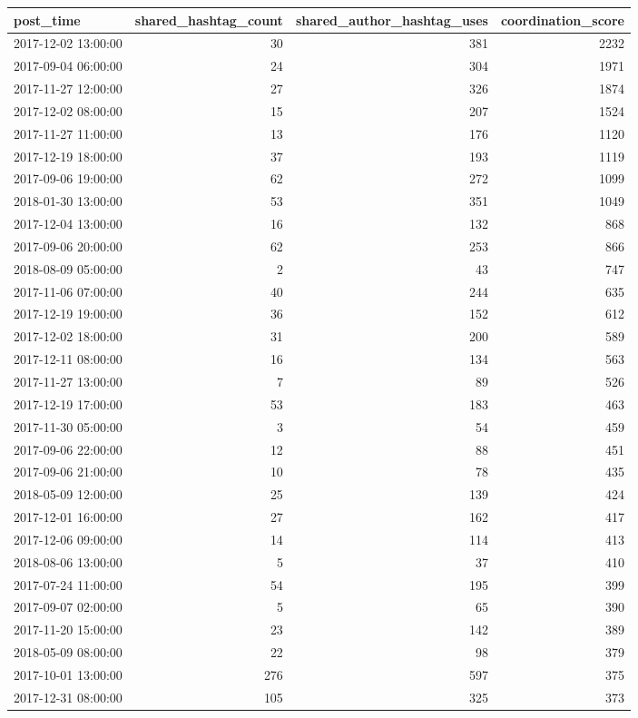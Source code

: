 \begin{tabular}{lrrr}
\toprule
post\_time & shared\_hashtag\_count & shared\_author\_hashtag\_uses & coordination\_score \\
\midrule
2017-12-02 13:00:00 & 30 & 381 & 2232 \\
2017-09-04 06:00:00 & 24 & 304 & 1971 \\
2017-11-27 12:00:00 & 27 & 326 & 1874 \\
2017-12-02 08:00:00 & 15 & 207 & 1524 \\
2017-11-27 11:00:00 & 13 & 176 & 1120 \\
2017-12-19 18:00:00 & 37 & 193 & 1119 \\
2017-09-06 19:00:00 & 62 & 272 & 1099 \\
2018-01-30 13:00:00 & 53 & 351 & 1049 \\
2017-12-04 13:00:00 & 16 & 132 & 868 \\
2017-09-06 20:00:00 & 62 & 253 & 866 \\
2018-08-09 05:00:00 & 2 & 43 & 747 \\
2017-11-06 07:00:00 & 40 & 244 & 635 \\
2017-12-19 19:00:00 & 36 & 152 & 612 \\
2017-12-02 18:00:00 & 31 & 200 & 589 \\
2017-12-11 08:00:00 & 16 & 134 & 563 \\
2017-11-27 13:00:00 & 7 & 89 & 526 \\
2017-12-19 17:00:00 & 53 & 183 & 463 \\
2017-11-30 05:00:00 & 3 & 54 & 459 \\
2017-09-06 22:00:00 & 12 & 88 & 451 \\
2017-09-06 21:00:00 & 10 & 78 & 435 \\
2018-05-09 12:00:00 & 25 & 139 & 424 \\
2017-12-01 16:00:00 & 27 & 162 & 417 \\
2017-12-06 09:00:00 & 14 & 114 & 413 \\
2018-08-06 13:00:00 & 5 & 37 & 410 \\
2017-07-24 11:00:00 & 54 & 195 & 399 \\
2017-09-07 02:00:00 & 5 & 65 & 390 \\
2017-11-20 15:00:00 & 23 & 142 & 389 \\
2018-05-09 08:00:00 & 22 & 98 & 379 \\
2017-10-01 13:00:00 & 276 & 597 & 375 \\
2017-12-31 08:00:00 & 105 & 325 & 373 \\

\end{tabular}
